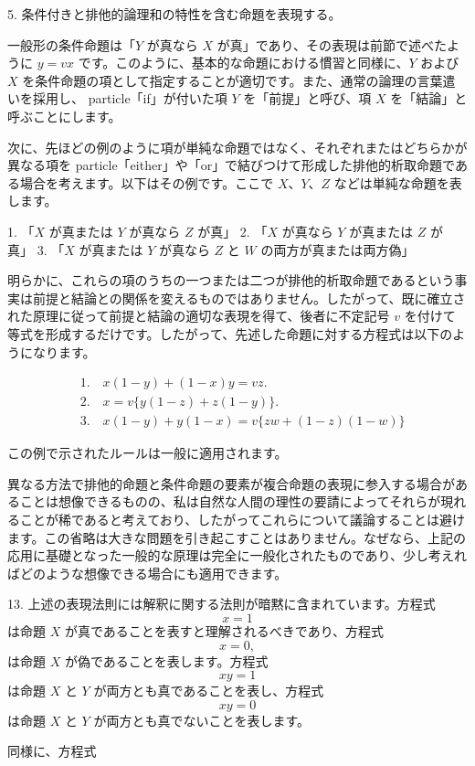 \documentclass[a4paper,11pt,openany]{ltjsbook}
\begin{document}
5. 条件付きと排他的論理和の特性を含む命題を表現する。

一般形の条件命題は「$Y$ が真なら $X$ が真」であり、その表現は前節で述べたように $y = vx$ です。このように、基本的な命題における慣習と同様に、$Y$ および $X$ を条件命題の項として指定することが適切です。また、通常の論理の言葉遣いを採用し、 particle「if」が付いた項 $Y$ を「前提」と呼び、項 $X$ を「結論」と呼ぶことにします。

次に、先ほどの例のように項が単純な命題ではなく、それぞれまたはどちらかが異なる項を particle「either」や「or」で結びつけて形成した排他的析取命題である場合を考えます。以下はその例です。ここで $X$、$Y$、$Z$ などは単純な命題を表します。

1. 「$X$ が真または $Y$ が真なら $Z$ が真」
2. 「$X$ が真なら $Y$ が真または $Z$ が真」
3. 「$X$ が真または $Y$ が真なら $Z$ と $W$ の両方が真または両方偽」

明らかに、これらの項のうちの一つまたは二つが排他的析取命題であるという事実は前提と結論との関係を変えるものではありません。したがって、既に確立された原理に従って前提と結論の適切な表現を得て、後者に不定記号 $v$ を付けて等式を形成するだけです。したがって、先述した命題に対する方程式は以下のようになります。

\begin{eqnarray*}
&1. \quad x(1 - y) + (1 - x)y = vz.\\
&2. \quad x = v \{y(1-z)+z(1-y)\}.\\
&3. \quad x (1 - y) + y (1 - x) = v \{ zw + (1 - z) (1 - w) \}
\end{eqnarray*}

この例で示されたルールは一般に適用されます。

異なる方法で排他的命題と条件命題の要素が複合命題の表現に参入する場合があることは想像できるものの、私は自然な人間の理性の要請によってそれらが現れることが稀であると考えており、したがってこれらについて議論することは避けます。この省略は大きな問題を引き起こすことはありません。なぜなら、上記の応用に基礎となった一般的な原理は完全に一般化されたものであり、少し考えればどのような想像できる場合にも適用できます。

13. 上述の表現法則には解釈に関する法則が暗黙に含まれています。方程式
\[
x = 1
\]
は命題 $X$ が真であることを表すと理解されるべきであり、方程式
\[
x = 0,
\]
は命題 $X$ が偽であることを表します。方程式
\[
xy = 1
\]
は命題 $X$ と $Y$ が両方とも真であることを表し、方程式
\[
xy = 0
\]
は命題 $X$ と $Y$ が両方とも真でないことを表します。

同様に、方程式
\end{document}
